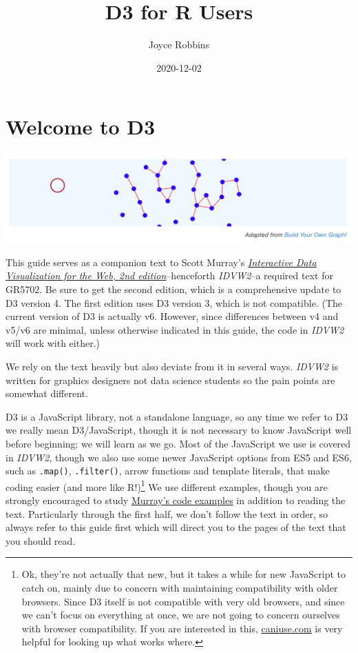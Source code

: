 \documentclass[
  openany]{book}
\title{D3 for R Users}
\author{Joyce Robbins}
\date{2020-12-02}
\begin{document}
\maketitle

{
\setcounter{tocdepth}{1}
\tableofcontents
}
\hypertarget{welcome-to-d3}{%
\chapter*{Welcome to D3}\label{welcome-to-d3}}

\hypertarget{container}{}

\includegraphics[width=1\linewidth]{images/pdfbook/buildyourowngraph}

This guide serves as a companion text to Scott Murray's \href{https://www.amazon.com/Interactive-Data-Visualization-Web-Introduction/dp/1491921285/}{\emph{Interactive Data Visualization for the Web, 2nd edition}}--henceforth \emph{IDVW2}--a required text for GR5702. Be sure to get the second edition, which is a comprehensive update to D3 version 4. The first edition uses D3 version 3, which is not compatible. (The current version of D3 is actually v6. However, since differences between v4 and v5/v6 are minimal, unless otherwise indicated in this guide, the code in \emph{IDVW2} will work with either.)

We rely on the text heavily but also deviate from it in several ways. \emph{IDVW2} is written for graphics designers not data science students so the pain points are somewhat different.

D3 is a JavaScript library, not a standalone language, so any time we refer to D3 we really mean D3/JavaScript, though it is not necessary to know JavaScript well before beginning; we will learn as we go. Most of the JavaScript we use is covered in \emph{IDVW2}, though we also use some newer JavaScript options from ES5 and ES6, such as \texttt{.map()}, \texttt{.filter()}, arrow functions and template literals, that make coding easier (and more like R!)\footnote{Ok, they're not actually that new, but it takes a while for new JavaScript to catch on, mainly due to concern with maintaining compatibility with older browsers. Since D3 itself is not compatible with very old browsers, and since we can't focus on everything at once, we are not going to concern ourselves with browser compatibility. If you are interested in this, \href{https://caniuse.com}{caniuse.com} is very helpful for looking up what works where.} We use different examples, though you are strongly encouraged to study \href{https://github.com/alignedleft/d3-book/releases}{Murray's code examples} in addition to reading the text. Particularly through the first half, we don't follow the text in order, so always refer to this guide first which will direct you to the pages of the text that you should read.
\end{document}
